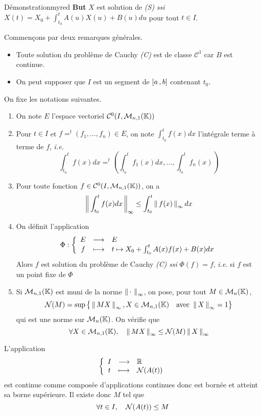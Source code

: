     \begin{omed}{Démonstration}{myred}
        \textbf{But} \quad $X$ est solution de \textit{(S)} \textit{ssi} $X(t) = X_0 + \int_{t_0}^{t} A(u)X(u) + B(u) du$ pour tout $t \in I$.

        Commençons par deux remarques générales.
        \begin{itemize}[label=\textcolor{myred}{$star$}]
            \item Toute solution du problème de Cauchy \textit{(C)} est de classe $\mathcal{C}^1$ car $B$ est continue.
            \item On peut supposer que $I$ est un segment de $\left[ a \, , b \right]$ contenant $t_0$.
        \end{itemize}
        On fixe les notations suivantes.
        \begin{enumerate}[label=\textcolor{myred}{(\alph*)}]
            \item On note $E$ l’espace vectoriel $\mathcal{C}^0(I, \mathcal{M}_{n,1}(\mathbb{K}))$
            \item Pour $t \in I$ et $f = ^t (f_1,\ldots,f_n) \in E$, on note $\int_{t_0}^{t} f(x)dx$ l’intégrale terme à terme de $f$, \textit{i.e.}
            \[ \int_{t_0}^{t} f(x)dx = ^t \left(\int_{t_0}^{t} f_1(x)dx , \ldots, \int_{t_0}^{t} f_n(x)\right) \]
            \item Pour toute fonction $f \in \mathcal{C}^0(I, \mathcal{M}_{n,1}(\mathbb{K}))$, on a 
            \[ \left\lVert\,\int_{t_0}^{t} f(x)dx\,\right\rVert_{\infty} \leq \int_{t_0}^{t} \left\lVert\,f(x)\,\right\rVert_{\infty}dx \]
            \item On définit l’application 
            \[ \fonction{\Phi}{E}{E}{f}{t \mapsto X_0 + \int_{t_0}^{t} A(x)f(x) + B(x)dx} \]   
            Alors $f$ est solution du problème de Cauchy \textit{(C)} \textit{ssi} $\Phi(f)=f$, \textit{i.e.} si $f$ est un point fixe de $\Phi$
            \item Si $\mathcal{M}_{n,1}(\mathbb{K})$ est muni de la norme $\left\lVert\,\cdotp\,\right\rVert_{\infty}$, on pose, pour tout $M \in \mathcal{M}_{n}(\mathbb{K})$, 
            \[ \mathcal{N}(M) = \sup\big\{ \left\lVert\,MX\,\right\rVert_{\infty}, X \in \mathcal{M}_{n,1}(\mathbb{K}) \quad \text{avec } \left\lVert\,X\,\right\rVert_{\infty} = 1 \big\} \]
            qui est une norme sur $\mathcal{M}_{n}(\mathbb{K})$. On vérifie que
            \[ \forall X \in \mathcal{M}_{n,1}(\mathbb{K}), \quad \left\lVert\,MX\,\right\rVert_{\infty} \leq \mathcal{N}(M) \left\lVert\,X\,\right\rVert_{\infty} \]
        \end{enumerate}
        L’application \[ \application{I}{\mathbb{R}}{t}{\normm{A(t)}} \] est continue comme composée d’applications continues donc est bornée et atteint sa borne supérieure. Il existe donc $M$ tel que 
        \[ \forall t \in I, \quad \mathcal{N}(A(t)) \leq M \]


\end{omed}
